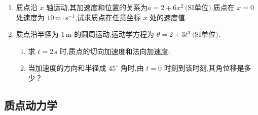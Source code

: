 \begin{enumerate}
\item[\textbf{1-25}] 质点沿 \(x\) 轴运动,其加速度和位置的关系为$a=2+6x^2\ \text{(SI单位)}.$质点在 \(x=0\) 处速度为 \(10\,\text{m}\cdot\text{s}^{-1}\),试求质点在任意坐标 \(x\) 处的速度值.

\item[\textbf{1-26}] 质点沿半径为 \(1\,\text{m}\) 的圆周运动,运动学方程为
$\theta=2+3t^3\ \text{(SI单位)}.$

\begin{enumerate}
	\item 求 \(t=2\,\text{s}\) 时,质点的切向加速度和法向加速度;
	\item 当加速度的方向和半径成 \(45^\circ\) 角时,由 \(t=0\) 时刻到该时刻,其角位移是多少？
\end{enumerate}

\end{enumerate}


\newpage
\subsection{质点动力学}

